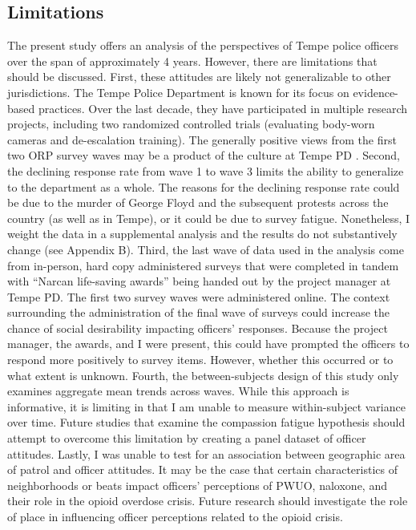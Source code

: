 \subsection{Limitations}
The present study offers an analysis of the perspectives of Tempe police officers over the span of approximately 4 years. However, there are limitations that should be discussed. First, these attitudes are likely not generalizable to other jurisdictions. The Tempe Police Department is known for its focus on evidence-based practices. Over the last decade, they have participated in multiple research projects, including two randomized controlled trials (evaluating body-worn cameras and de-escalation training). The generally positive views from the first two ORP survey waves may be a product of the culture at Tempe PD \parencite{white_narcan_2021}. 
Second, the declining response rate from wave 1 to wave 3 limits the ability to generalize to the department as a whole. The reasons for the declining response rate could be due to the murder of George Floyd and the subsequent protests across the country (as well as in Tempe), or it could be due to survey fatigue. Nonetheless, I weight the data in a supplemental analysis and the results do not substantively change (see Appendix B). Third, the last wave of data used in the analysis come from in-person, hard copy administered surveys that were completed in tandem with “Narcan life-saving awards” being handed out by the project manager at Tempe PD. The first two survey waves were administered online. The context surrounding the administration of the final wave of surveys could increase the chance of social desirability impacting officers’ responses. Because the project manager, the awards, and I were present, this could have prompted the officers to respond more positively to survey items. However, whether this occurred or to what extent is unknown. Fourth, the between-subjects design of this study only examines aggregate mean trends across waves. While this approach is informative, it is limiting in that I am unable to measure within-subject variance over time. Future studies that examine the compassion fatigue hypothesis should attempt to overcome this limitation by creating a panel dataset of officer attitudes. Lastly, I was unable to test for an association between geographic area of patrol and officer attitudes.  It may be the case that certain characteristics of neighborhoods or beats impact officers' perceptions of PWUO, naloxone, and their role in the opioid overdose crisis. Future research should investigate the role of place in influencing officer perceptions related to the opioid crisis. 

